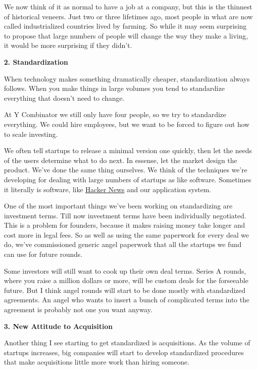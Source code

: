 We now think of it as normal to have a job at a company, but this is the
thinnest of historical veneers. Just two or three lifetimes ago, most
people in what are now called industrialized countries lived by farming.
So while it may seem surprising to propose that large numbers of people
will change the way they make a living, it would be more surprising if
they didn't.

\textbf{2. Standardization}

When technology makes something dramatically cheaper, standardization
always follows. When you make things in large volumes you tend to
standardize everything that doesn't need to change.

At Y Combinator we still only have four people, so we try to standardize
everything. We could hire employees, but we want to be forced to figure
out how to scale investing.

We often tell startups to release a minimal version one quickly, then
let the needs of the users determine what to do next. In essense, let
the market design the product. We've done the same thing ourselves. We
think of the techniques we're developing for dealing with large numbers
of startups as like software. Sometimes it literally is software, like
\href{http://news.ycombinator.com}{Hacker News} and our application
system.

One of the most important things we've been working on standardizing are
investment terms. Till now investment terms have been individually
negotiated. This is a problem for founders, because it makes raising
money take longer and cost more in legal fees. So as well as using the
same paperwork for every deal we do, we've commissioned generic angel
paperwork that all the startups we fund can use for future rounds.

Some investors will still want to cook up their own deal terms. Series A
rounds, where you raise a million dollars or more, will be custom deals
for the forseeable future. But I think angel rounds will start to be
done mostly with standardized agreements. An angel who wants to insert a
bunch of complicated terms into the agreement is probably not one you
want anyway.

\textbf{3. New Attitude to Acquisition}

Another thing I see starting to get standardized is acquisitions. As the
volume of startups increases, big companies will start to develop
standardized procedures that make acquisitions little more work than
hiring someone.

